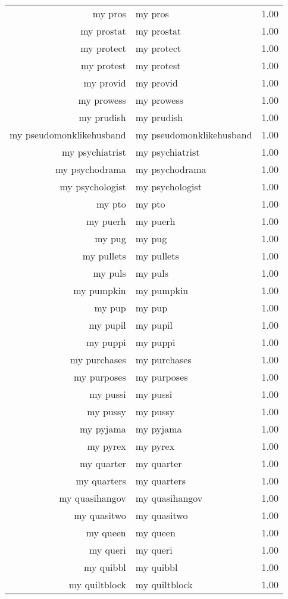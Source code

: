 \begin{table}[ht]
\begin{tabular}{rlr}
  my pros & my pros & 1.00 \\ 
  my prostat & my prostat & 1.00 \\ 
  my protect & my protect & 1.00 \\ 
  my protest & my protest & 1.00 \\ 
  my provid & my provid & 1.00 \\ 
  my prowess & my prowess & 1.00 \\ 
  my prudish & my prudish & 1.00 \\ 
  my pseudomonklikehusband & my pseudomonklikehusband & 1.00 \\ 
  my psychiatrist & my psychiatrist & 1.00 \\ 
  my psychodrama & my psychodrama & 1.00 \\ 
  my psychologist & my psychologist & 1.00 \\ 
  my pto & my pto & 1.00 \\ 
  my puerh & my puerh & 1.00 \\ 
  my pug & my pug & 1.00 \\ 
  my pullets & my pullets & 1.00 \\ 
  my puls & my puls & 1.00 \\ 
  my pumpkin & my pumpkin & 1.00 \\ 
  my pup & my pup & 1.00 \\ 
  my pupil & my pupil & 1.00 \\ 
  my puppi & my puppi & 1.00 \\ 
  my purchases & my purchases & 1.00 \\ 
  my purposes & my purposes & 1.00 \\ 
  my pussi & my pussi & 1.00 \\ 
  my pussy & my pussy & 1.00 \\ 
  my pyjama & my pyjama & 1.00 \\ 
  my pyrex & my pyrex & 1.00 \\ 
  my quarter & my quarter & 1.00 \\ 
  my quarters & my quarters & 1.00 \\ 
  my quasihangov & my quasihangov & 1.00 \\ 
  my quasitwo & my quasitwo & 1.00 \\ 
  my queen & my queen & 1.00 \\ 
  my queri & my queri & 1.00 \\ 
  my quibbl & my quibbl & 1.00 \\ 
  my quiltblock & my quiltblock & 1.00 \\ 

\end{tabular}
\end{table}
